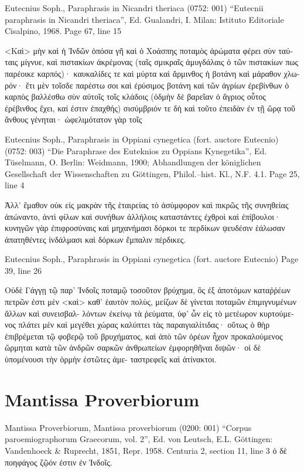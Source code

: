 \documentclass[12pt,letterpaper,twoside,final]{memoir}
\begin{document}
\begin{greek}

Eutecnius Soph., Paraphrasis in Nicandri theriaca (0752: 001)
“Eutecnii paraphrasis in Nicandri theriaca”, Ed. Gualandri, I.
Milan: Istituto Editoriale Cisalpino, 1968.
Page 67, line 15

                     <Καὶ> μὴν καὶ ἡ Ἰνδῶν ὁπόσα γῆ καὶ 
ὁ Χοάσπης ποταμὸς ἀρώματα φέρει σὺν ταύταις μίγνυε, 
καὶ πιστακίων ἀκρέμονας (ταῖς σμικραῖς ἀμυγδάλαις ὁ 
τῶν πιστακίων πως παρέοικε καρπός)· καυκαλίδες τε καὶ 
μύρτα καὶ ἄρμινθος ἡ βοτάνη καὶ μάραθον χλωρόν· ἔτι 
μὲν τοῖσδε παρέστω σοι καὶ ἐρύσιμος βοτάνη καὶ τῶν 
ἀγρίων ἐρεβίνθων ὁ καρπὸς βαλλέσθω σὺν αὐτοῖς τοῖς 
κλάδοις (ὀδμὴν δὲ βαρεῖαν ὁ ἄγριος οὗτος ἐρέβινθος ἔχει, 
καί ἐστιν ἐπαχθής) σισύμβριόν τε δὴ καὶ τοῦτο ἐπειδὰν 
ἐν τῇ ὥρᾳ τοῦ ἄνθους γένηται· ὠφελιμότατον γὰρ τοῖς 

Eutecnius Soph., Paraphrasis in Oppiani cynegetica (fort. auctore Eutecnio) (0752: 003)
“Die Paraphrase des Euteknios zu Oppians Kynegetika”, Ed. Tüselmann, O.
Berlin: Weidmann, 1900; Abhandlungen der königlichen Gesellschaft der Wissenschaften zu Göttingen, Philol.–hist. Kl., N.F. 4.1.
Page 25, line 4

                                                            Ἀλλ' ἔμαθον οὐκ εἰς μακρὰν 
τῆς ἑταιρείας τὸ ἀσύμφορον καὶ πικρῶς τῆς συνηθείας ἀπώναντο, ἀντὶ φίλων καὶ 
συνήθων ἀλλήλοις καταστάντες ἐχθροὶ καὶ ἐπίβουλοι· κυνηγῶν γὰρ ἐπιφροσύναις καὶ 
μηχανήμασι δόρκοι τε περδίκων ψευδέσιν ἑάλωσαν ἀπατηθέντες ἰνδάλμασι καὶ δόρκων 
ἔμπαλιν πέρδικες. 



Eutecnius Soph., Paraphrasis in Oppiani cynegetica (fort. auctore Eutecnio) 
Page 39, line 26

                                                                         Οὐδὲ Γάγγῃ τῷ 
παρ' Ἰνδοῖς ποταμῷ τοσοῦτον βρύχημα, ὃς ἐξ ἀποτόμων καταῤῥέων πετρῶν ἐστι μὲν 
<καὶ> καθ' ἑαυτὸν πολὺς, μείζων δὲ γίνεται ποταμῶν ἐπιμιγνυμένων ἄλλων καὶ συνεισβαλ-
λόντων ἐκείνῳ τὰ ῥεύματα, ὑφ' ὧν εἰς τὸ μετέωρον κυρτούμενος πλάτει μὲν καὶ 
μεγέθει χώρας καλύπτει τὰς παραιγιαλίτιδας· οὕτως ὁ θὴρ ἐπιβρέμεται τῷ φοβερῷ 
τοῦ βρυχήματος, καὶ ἀπὸ τῶν ὀρέων ἦχον προκαλούμενος ὥρμηται κατὰ τῶν ἀνδρῶν 
σαρκῶν ἀνθρωπείων ἐμφορηθῆναι διψῶν· οἱ δὲ ὑπομένουσι τὴν ὁρμὴν ἑστῶτες ἀμε-
ταστρεφεῖς καὶ ἀτίνακτοι. 

\end{greek}


\section{Mantissa Proverbiorum}%
\begin{greek}
Mantissa Proverbiorum, Mantissa proverbiorum (0200: 001)
“Corpus paroemiographorum Graecorum, vol. 2”, Ed. von Leutsch, E.L.
Göttingen: Vandenhoeck \& Ruprecht, 1851, Repr. 1958.
Centuria 2, section 11, line 3
                                                                   ὁ 
δὲ ποηφάγος ζῷόν ἐστιν ἐν Ἰνδοῖς. 
\end{greek}
\end{document}
